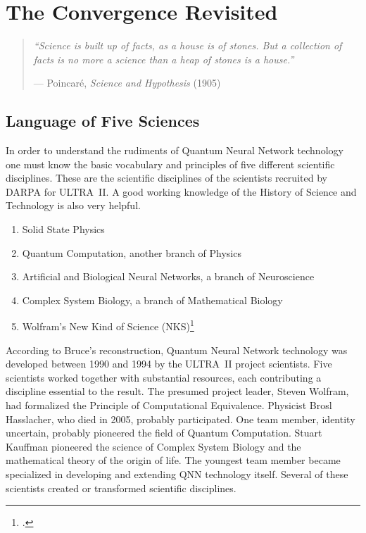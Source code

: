 
\chapter{The Convergence Revisited}
\label{pos21:convergence-revisited}

\begin{quote}\small\textit{%
``Science is built up of facts, as a house is of stones. But a collection of facts is no more a science than a heap of stones is a house.''%
}\par\raggedleft --- Poincar\'{e}, \textit{Science and Hypothesis} (1905)\end{quote}

\vspace{0.5cm}



\section*{Language of Five Sciences}
\label{pos21:language-of-five-sciences}

In order to understand the rudiments of Quantum Neural Network technology one must know the basic vocabulary and principles of five different scientific disciplines. These are the scientific disciplines of the scientists recruited by DARPA for ULTRA~II\@. A good working knowledge of the History of Science and Technology is also very helpful.

\begin{enumerate}
\item Solid State Physics
\item Quantum Computation, another branch of Physics
\item Artificial and Biological Neural Networks, a branch of Neuroscience
\item Complex System Biology, a branch of Mathematical Biology
\item Wolfram's New Kind of Science (NKS)\footcite{wolfram2002}
\end{enumerate}

According to Bruce's reconstruction, Quantum Neural Network technology was developed between 1990 and 1994 by the ULTRA~II project scientists. Five scientists worked together with substantial resources, each contributing a discipline essential to the result. The presumed project leader, Steven Wolfram, had formalized the Principle of Computational Equivalence. Physicist Brosl Hasslacher, who died in 2005, probably participated. One team member, identity uncertain, probably pioneered the field of Quantum Computation. Stuart Kauffman pioneered the science of Complex System Biology and the mathematical theory of the origin of life. The youngest team member became specialized in developing and extending QNN technology itself. Several of these scientists created or transformed scientific disciplines.


